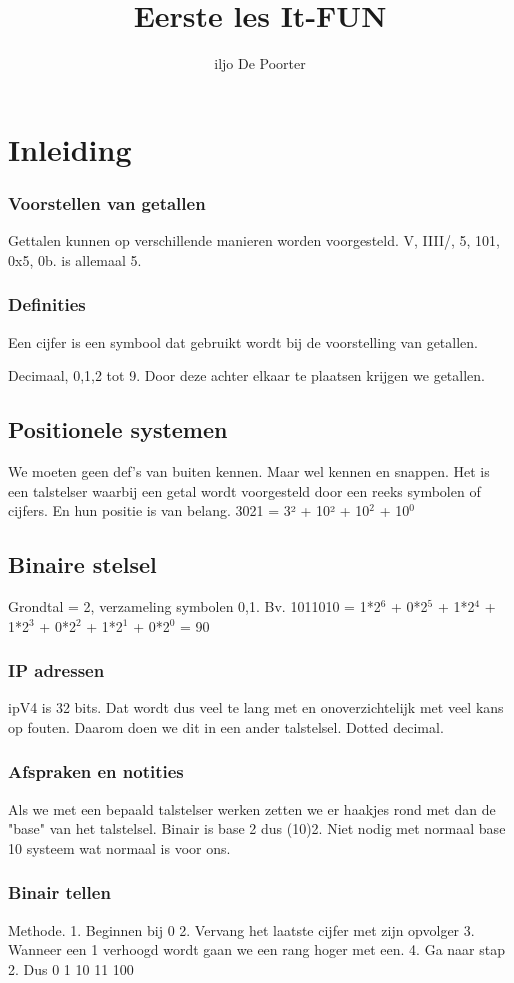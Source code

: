 \documentclass{article}
\author{iljo De Poorter}
\title{Eerste les It-FUN}
\begin{document}
\maketitle

\section{Inleiding}
\subsubsection{Voorstellen van getallen}
Gettalen kunnen op verschillende manieren worden voorgesteld.
V, IIII/, 5, 101, 0x5, 0b. is allemaal 5.
\subsubsection{Definities}
Een cijfer is een symbool dat gebruikt wordt bij de voorstelling van getallen.


Decimaal, 0,1,2 tot 9.
Door deze achter elkaar te plaatsen krijgen we getallen.
\subsection{Positionele systemen}
We moeten geen def's van buiten kennen. Maar wel kennen en snappen.
Het is een talstelser waarbij een getal wordt voorgesteld door een reeks symbolen of cijfers. En hun positie is van belang.
3021 = 3² + 10² + 10$^2$ + 10$^0$
\subsection{Binaire stelsel}
Grondtal = 2, verzameling symbolen {0,1}.
Bv. 1011010 = 1*2$^6$ + 0*2$^5$ + 1*2$^4$ + 1*2$^3$ + 0*2$^2$ + 1*2$^1$ + 0*2$^0$ = 90
\subsubsection{IP adressen}
ipV4 is 32 bits. Dat wordt dus veel te lang met en onoverzichtelijk met veel kans op fouten. Daarom doen we dit in een ander talstelsel. Dotted decimal.
\subsubsection{Afspraken en notities}
Als we met een bepaald talstelser werken zetten we er haakjes rond met dan de "base" van het talstelsel. Binair is base 2 dus (10)2. Niet nodig met normaal base 10 systeem wat normaal is voor ons.
\subsubsection{Binair tellen}
Methode.
1. Beginnen bij 0
2. Vervang het laatste cijfer met zijn opvolger
3. Wanneer een 1 verhoogd wordt gaan we een rang hoger met een.
4. Ga naar stap 2.
Dus 
0
1
10
11
100
\end{document}
